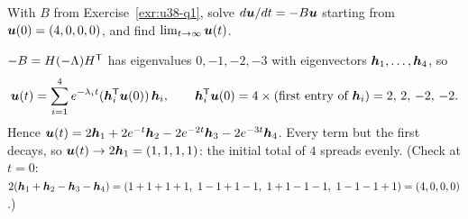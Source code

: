 \begin{exercise}\label{exr:u38-flow}
With $B$ from Exercise~\ref{exr:u38-q1}, solve $d\boldsymbol{u}/dt=-B\boldsymbol{u}$ starting from $\boldsymbol{u}(0)=(4,0,0,0)$, and find $\lim_{t\to\infty}\boldsymbol{u}(t)$.
\end{exercise}
\begin{solution}
$-B=H(-\Lambda)H^{\mathsf{T}}$ has eigenvalues $0,-1,-2,-3$ with eigenvectors $\boldsymbol{h}_1,\dots,\boldsymbol{h}_4$, so
\[
\boldsymbol{u}(t)=\sum_{i=1}^{4}e^{-\lambda_it}(\boldsymbol{h}_i^{\mathsf{T}}\boldsymbol{u}(0))\,\boldsymbol{h}_i,\qquad \boldsymbol{h}_i^{\mathsf{T}}\boldsymbol{u}(0)=4\times(\text{first entry of }\boldsymbol{h}_i)=2,\,2,\,-2,\,-2.
\]
Hence $\boldsymbol{u}(t)=2\boldsymbol{h}_1+2e^{-t}\boldsymbol{h}_2-2e^{-2t}\boldsymbol{h}_3-2e^{-3t}\boldsymbol{h}_4$. Every term but the first decays, so $\boldsymbol{u}(t)\to2\boldsymbol{h}_1=(1,1,1,1)$: the initial total of $4$ spreads evenly. (Check at $t=0$: $2(\vb{h}_1+\vb{h}_2-\vb{h}_3-\vb{h}_4)=(1+1+1+1,\ 1-1+1-1,\ 1+1-1-1,\ 1-1-1+1)=(4,0,0,0)$.)
\end{solution}
